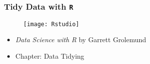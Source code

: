\documentclass[TIDYMASTER.tex]{subfiles}
\begin{document}
 

\begin{frame}[fragile]
	\frametitle{Tidy Data with \texttt{R}}
	\Large
\begin{figure}
\centering
\texttt{[image: Rstudio]}
\end{figure}
\begin{itemize}
\item \textit{Data Science with R} by Garrett Grolemund
\item Chapter: Data Tidying
\end{itemize}	


\end{frame}
\end{document}

